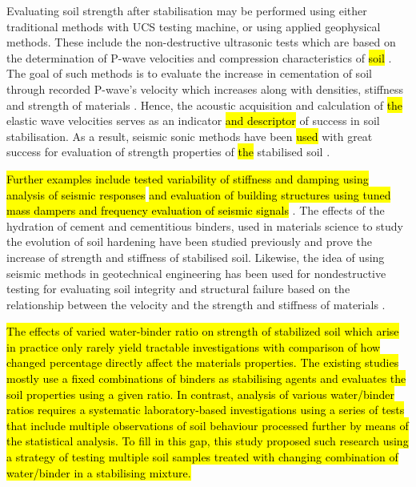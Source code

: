 \documentclass[sustainability,article,submit,pdftex,moreauthors]{Definitions/mdpi}
\begin{document}
Evaluating soil strength after stabilisation may be performed using either traditional methods with UCS testing machine, or using applied geophysical methods. These include the non-destructive ultrasonic tests which are based on the determination of P-wave velocities and compression characteristics of\hl{ soil} \cite{Yesiller}. The goal of such methods is to evaluate the increase in cementation of soil through recorded P-wave's velocity which increases along with densities, stiffness and strength of materials \cite{ZHANG2021143,Lindh2023JMBM,Abdi}. Hence, the acoustic acquisition and calculation of \hl{the }elastic wave velocities serves as an indicator \hl{and descriptor }of success in soil stabilisation. As a result, seismic sonic methods have been \hl{used }with great success for evaluation of strength properties of \hl{the }stabilised soil \cite{Lopes,Lindh202210,CRISTELO20151}. 

\hl{Further examples include tested variability of stiffness and damping using analysis of seismic responses} \cite{WANG2022114963} \hl{and evaluation of building structures using tuned mass dampers and frequency evaluation of seismic signals} \cite{WANG2022107298}. The effects of the hydration of cement and cementitious binders, used in materials science to study the evolution of soil hardening have been studied previously \cite{Ardah,Sree,su142113736} and prove the increase of strength and stiffness of stabilised soil. Likewise, the idea of using seismic methods in geotechnical engineering has been used for nondestructive testing for evaluating soil integrity and structural failure based on the relationship between the velocity and the strength and stiffness of materials \cite{Yu}.  

\hl{The effects of varied water-binder ratio on strength of stabilized soil which arise in practice only rarely yield tractable investigations with comparison of how changed percentage directly affect the materials properties. The existing studies mostly use a fixed combinations of binders as stabilising agents and evaluates the soil properties using a given ratio. In contrast, analysis of various water/binder ratios requires a systematic laboratory-based investigations using a series of tests that include multiple observations of soil behaviour processed further by means of the statistical analysis. To fill in this gap, this study proposed such research using a strategy of testing multiple soil samples treated with changing combination of water/binder in a stabilising mixture.}
\end{document}
